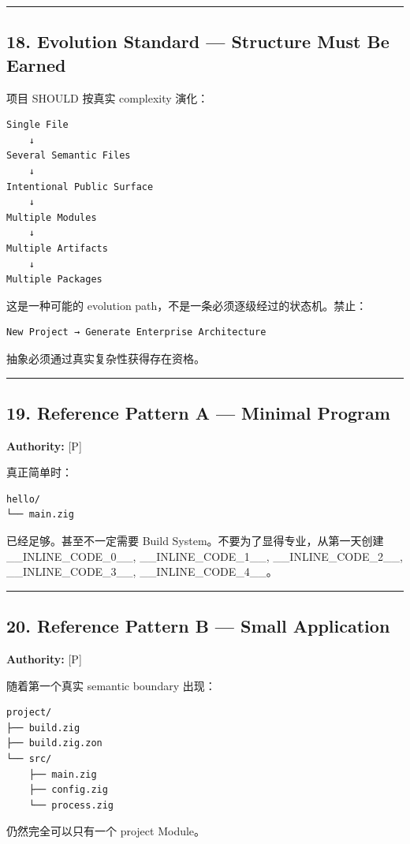 \documentclass[11pt,a4paper]{article}
\begin{document}
\vspace{0.5em}\hrule\vspace{0.5em}
\subsection{18. Evolution Standard — Structure Must Be Earned}
项目 SHOULD 按真实 complexity 演化：

\begin{lstlisting}[language=text]
Single File
    ↓
Several Semantic Files
    ↓
Intentional Public Surface
    ↓
Multiple Modules
    ↓
Multiple Artifacts
    ↓
Multiple Packages
\end{lstlisting}
这是一种可能的 evolution path，不是一条必须逐级经过的状态机。禁止：

\begin{lstlisting}[language=text]
New Project → Generate Enterprise Architecture
\end{lstlisting}
抽象必须通过真实复杂性获得存在资格。

\vspace{0.5em}\hrule\vspace{0.5em}
\subsection{19. Reference Pattern A — Minimal Program}
\textbf{Authority:} [P]

真正简单时：

\begin{lstlisting}[language=text]
hello/
└── main.zig
\end{lstlisting}
已经足够。甚至不一定需要 Build System。不要为了显得专业，从第一天创建 \_\_INLINE\_CODE\_0\_\_, \_\_INLINE\_CODE\_1\_\_, \_\_INLINE\_CODE\_2\_\_, \_\_INLINE\_CODE\_3\_\_, \_\_INLINE\_CODE\_4\_\_。

\vspace{0.5em}\hrule\vspace{0.5em}
\subsection{20. Reference Pattern B — Small Application}
\textbf{Authority:} [P]

随着第一个真实 semantic boundary 出现：

\begin{lstlisting}[language=text]
project/
├── build.zig
├── build.zig.zon
└── src/
    ├── main.zig
    ├── config.zig
    └── process.zig
\end{lstlisting}
仍然完全可以只有一个 project Module。
\end{document}

